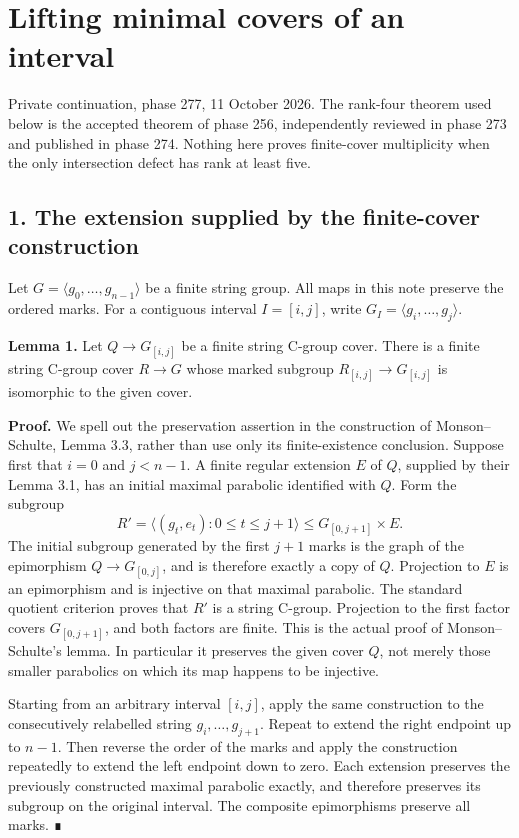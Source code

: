 \documentclass[
  11pt,
  a4paper,
]{article}
\author{}
\date{}
\begin{document}
\section{Lifting minimal covers of an
interval}\label{lifting-minimal-covers-of-an-interval}

Private continuation, phase 277, 11 October 2026. The rank-four theorem
used below is the accepted theorem of phase 256, independently reviewed
in phase 273 and published in phase 274. Nothing here proves
finite-cover multiplicity when the only intersection defect has rank at
least five.

\subsection{1. The extension supplied by the finite-cover
construction}\label{the-extension-supplied-by-the-finite-cover-construction}

Let \(G=\langle g_0,\ldots,g_{n-1}\rangle\) be a finite string group.
All maps in this note preserve the ordered marks. For a contiguous
interval \(I=[i,j]\), write \(G_I=\langle g_i,\ldots,g_j\rangle\).

\textbf{Lemma 1.} Let \(Q\to G_{[i,j]}\) be a finite string C-group
cover. There is a finite string C-group cover \(R\to G\) whose marked
subgroup \(R_{[i,j]}\to G_{[i,j]}\) is isomorphic to the given cover.

\textbf{Proof.} We spell out the preservation assertion in the
construction of Monson--Schulte, Lemma 3.3, rather than use only its
finite-existence conclusion. Suppose first that \(i=0\) and \(j<n-1\). A
finite regular extension \(E\) of \(Q\), supplied by their Lemma 3.1,
has an initial maximal parabolic identified with \(Q\). Form the
subgroup \[
 R'=\langle(g_t,e_t):0\le t\le j+1\rangle
       \le G_{[0,j+1]}\times E.
\] The initial subgroup generated by the first \(j+1\) marks is the
graph of the epimorphism \(Q\to G_{[0,j]}\), and is therefore exactly a
copy of \(Q\). Projection to \(E\) is an epimorphism and is injective on
that maximal parabolic. The standard quotient criterion proves that
\(R'\) is a string C-group. Projection to the first factor covers
\(G_{[0,j+1]}\), and both factors are finite. This is the actual proof
of Monson--Schulte's lemma. In particular it preserves the given cover
\(Q\), not merely those smaller parabolics on which its map happens to
be injective.

Starting from an arbitrary interval \([i,j]\), apply the same
construction to the consecutively relabelled string
\(g_i,\ldots,g_{j+1}\). Repeat to extend the right endpoint up to
\(n-1\). Then reverse the order of the marks and apply the construction
repeatedly to extend the left endpoint down to zero. Each extension
preserves the previously constructed maximal parabolic exactly, and
therefore preserves its subgroup on the original interval. The composite
epimorphisms preserve all marks. ∎
\end{document}
